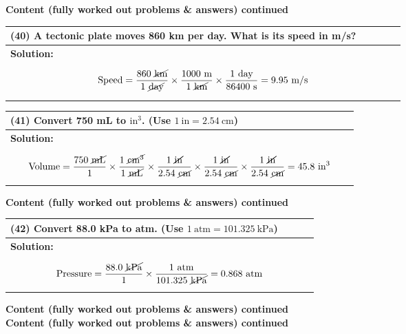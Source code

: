 \documentclass{article}
\begin{document}
\newpage
\noindent
{\large \textbf{Content (fully worked out problems \& answers) continued}} \\[0.2em]
\begin{tabular}{|p{0.9\linewidth}|}
\hline
\vspace{0.2cm}

\textbf{(40)} A tectonic plate moves 860 km per day. What is its speed in m/s? \\
\hline
\textbf{Solution:} \\
\[
\text{Speed} = \frac{860~\cancel{\text{km}}}{1~\cancel{\text{day}}} \times \frac{1000~\text{m}}{1~\cancel{\text{km}}} \times \frac{1~\text{day}}{86400~\text{s}} = 9.95~\text{m/s}
\]
\\
\hline
\end{tabular}
\newpage
\begin{tabular}{|p{0.9\linewidth}|}
\hline
\vspace{0.2cm}

\textbf{(41)} Convert 750 mL to $\text{in}^3$. (Use $1~\text{in}=2.54~\text{cm}$) \\
\hline
\textbf{Solution:} \\
\[
\text{Volume} = \frac{750~\cancel{\text{mL}}}{1} \times \frac{1~\cancel{\text{cm}^3}}{1~\cancel{\text{mL}}} \times \frac{1~\cancel{\text{in}}}{2.54~\cancel{\text{cm}}} \times \frac{1~\cancel{\text{in}}}{2.54~\cancel{\text{cm}}} \times \frac{1~\cancel{\text{in}}}{2.54~\cancel{\text{cm}}} = 45.8~\text{in}^3
\]
\\
\hline
\end{tabular}
\newpage
\noindent
{\large \textbf{Content (fully worked out problems \& answers) continued}} \\[0.2em]
\begin{tabular}{|p{0.9\linewidth}|}
\hline
\vspace{0.2cm}

\textbf{(42)} Convert 88.0 kPa to atm. (Use $1~\text{atm}=101.325~\text{kPa}$) \\
\hline
\textbf{Solution:} \\
\[
\text{Pressure} = \frac{88.0~\cancel{\text{kPa}}}{1} \times \frac{1~\text{atm}}{101.325~\cancel{\text{kPa}}} = 0.868~\text{atm}
\]
\\
\hline
\end{tabular}
\newpage
{\large \textbf{Content (fully worked out problems \& answers) continued}} \\[0.2em]
\noindent
{\large \textbf{Content (fully worked out problems \& answers) continued}} \\[0.2em]
\end{document}
